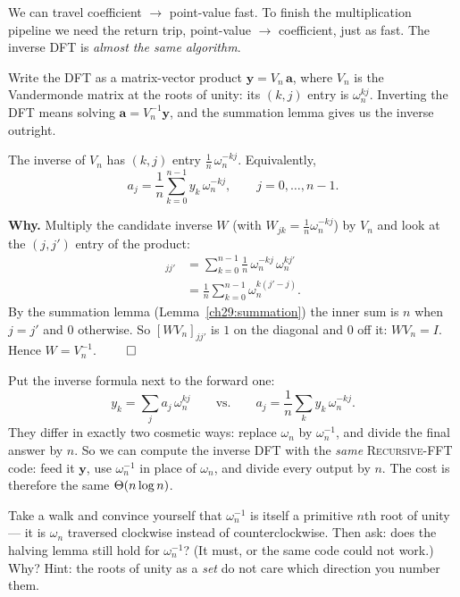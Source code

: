 We can travel coefficient $\to$ point-value fast. To finish the multiplication
pipeline we need the return trip, point-value $\to$ coefficient, just as fast. The inverse DFT is \emph{almost the same algorithm}.

Write the DFT as a matrix-vector product $\mathbf{y} = V_n\,\mathbf{a}$, where
$V_n$ is the Vandermonde matrix at the roots of unity: its $(k,j)$ entry is
$\omega_n^{kj}$. Inverting the DFT means solving $\mathbf{a} = V_n^{-1}\mathbf{y}$,
and the summation lemma gives us the inverse outright.

\begin{theorem}\label{ch29:idft-thm}
The inverse of $V_n$ has $(k,j)$ entry $\tfrac1n\,\omega_n^{-kj}$. Equivalently,
\[
a_j = \frac{1}{n}\sum_{k=0}^{n-1} y_k\,\omega_n^{-kj},\qquad j=0,\dots,n-1.
\]
\end{theorem}

\begin{formalbox}
\textbf{Why.} Multiply the candidate inverse $W$ (with $W_{jk}=\tfrac1n\omega_n^{-kj}$)
by $V_n$ and look at the $(j,j')$ entry of the product:
\begin{align*}
[WV_n]_{jj'} &= \sum_{k=0}^{n-1} \frac1n\,\omega_n^{-kj}\,\omega_n^{kj'} \\
            &= \frac1n\sum_{k=0}^{n-1} \omega_n^{k(j'-j)}.
\end{align*}
By the summation lemma (Lemma~\ref{ch29:summation}) the inner sum is $n$ when
$j=j'$ and $0$ otherwise. So $[WV_n]_{jj'}$ is $1$ on the diagonal and $0$ off it:
$WV_n = I$. Hence $W = V_n^{-1}$. $\qed$
\end{formalbox}

Put the inverse formula next to the forward one:
\[
y_k = \sum_{j} a_j\,\omega_n^{kj}
\qquad\text{vs.}\qquad
a_j = \frac1n\sum_{k} y_k\,\omega_n^{-kj}.
\]
They differ in exactly two cosmetic ways: replace $\omega_n$ by $\omega_n^{-1}$, and
divide the final answer by $n$. So we can compute the inverse DFT with the
\emph{same} \textsc{Recursive-FFT} code: feed it $\mathbf{y}$, use $\omega_n^{-1}$ in
place of $\omega_n$, and divide every output by $n$. The cost is therefore the same
$\Theta(n\log n)$.

\begin{walkbox}
Take a walk and convince yourself that $\omega_n^{-1}$ is itself a primitive $n$th
root of unity --- it is $\omega_n$ traversed clockwise instead of
counterclockwise. Then ask: does the halving lemma still hold for $\omega_n^{-1}$?
(It must, or the same code could not work.) Why? Hint: the roots of unity as a
\emph{set} do not care which direction you number them.
\end{walkbox}

